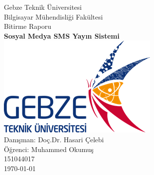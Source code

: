 \documentclass[12pt]{article}
\begin{document}


\begin{center}
\thispagestyle{empty}
{\LARGE Gebze Teknik Üniversitesi}\\[.5cm]
{\Large Bilgisayar Mühendisliği Fakültesi}\\[3cm]
{\linespread{1.2} {\Large Bitirme Raporu}}\\[0.5cm]
{\huge \bfseries Sosyal Medya SMS Yayın Sistemi}\\[1.5cm]
\linespread{1}
\includegraphics{Report/images/gebze_logo.png}\\
\vspace{\fill}
{\Large Danışman: Doç.Dr. Hasari Çelebi}\\[0.5cm]
{\Large Öğrenci: Muhammed Okumuş}\\[0.5cm]
{\Large 151044017}\\[0.5cm]
{\Large \today}
\end{center}

\clearpage
{}

\newpage

\tableofcontents

\newpage





\newpage




\newpage

 


\newpage
\end{document}
